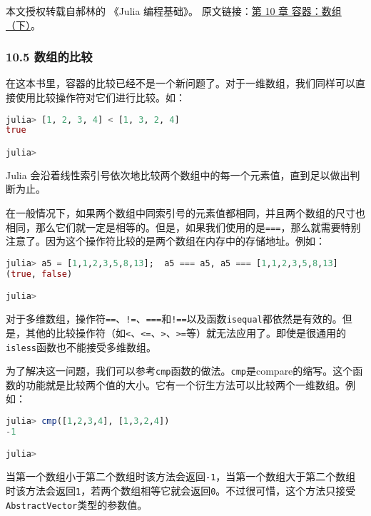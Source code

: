 
本文授权转载自郝林的 《Julia 编程基础》。 原文链接：\href{https://github.com/hyper0x/JuliaBasics/blob/master/book/ch10.md}{第 10 章 容器：数组（下）}。


\subsubsection{10.5 数组的比较}

在这本书里，容器的比较已经不是一个新问题了。对于一维数组，我们同样可以直接使用比较操作符对它们进行比较。如：

\begin{lstlisting}[language=julia]
julia> [1, 2, 3, 4] < [1, 3, 2, 4]
true

julia> 
\end{lstlisting}

Julia 会沿着线性索引号依次地比较两个数组中的每一个元素值，直到足以做出判断为止。

在一般情况下，如果两个数组中同索引号的元素值都相同，并且两个数组的尺寸也相同，那么它们就一定是相等的。但是，如果我们使用的是\verb`===`，那么就需要特别注意了。因为这个操作符比较的是两个数组在内存中的存储地址。例如：

\begin{lstlisting}[language=julia]
julia> a5 = [1,1,2,3,5,8,13];  a5 === a5, a5 === [1,1,2,3,5,8,13]
(true, false)

julia> 
\end{lstlisting}

对于多维数组，操作符\verb`==`、\verb`!=`、\verb`===`和\verb`!==`以及函数\verb`isequal`都依然是有效的。但是，其他的比较操作符（如\verb`<`、\verb`<=`、\verb`>`、\verb`>=`等）就无法应用了。即使是很通用的\verb`isless`函数也不能接受多维数组。

为了解决这一问题，我们可以参考\verb`cmp`函数的做法。\verb`cmp`是compare的缩写。这个函数的功能就是比较两个值的大小。它有一个衍生方法可以比较两个一维数组。例如：

\begin{lstlisting}[language=julia]
julia> cmp([1,2,3,4], [1,3,2,4])
-1

julia> 
\end{lstlisting}

当第一个数组小于第二个数组时该方法会返回\verb`-1`，当第一个数组大于第二个数组时该方法会返回\verb`1`，若两个数组相等它就会返回\verb`0`。不过很可惜，这个方法只接受\verb`AbstractVector`类型的参数值。

